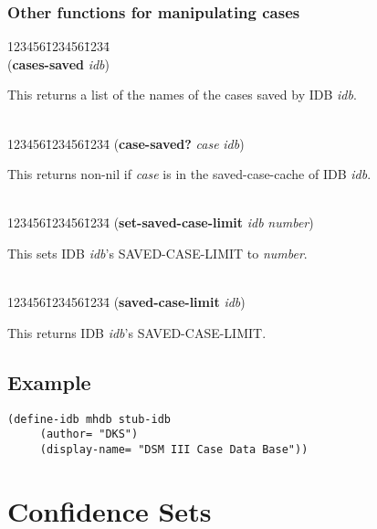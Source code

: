 \subsection{Other functions for manipulating cases}

\begin{tabbing}
123456\=123456\=1234\= \kill
\\
({\bf cases-saved} {\it idb}) \\
\end{tabbing}
This returns a list of the names of the cases saved by IDB {\it idb\/}.

\begin{tabbing}
\\
123456\=123456\=1234\= \kill
({\bf case-saved?} {\it case} {\it idb}) \\
\end{tabbing}
This returns non-nil if {\it case} is in the saved-case-cache of IDB
{\it idb\/}.


\begin{tabbing}
\\
123456\=123456\=1234\= \kill
({\bf set-saved-case-limit} {\it idb} {\it number}) \\
\end{tabbing}
This sets IDB {\it idb\/}'s SAVED-CASE-LIMIT to {\it number\/}.

\begin{tabbing}
\\
123456\=123456\=1234\= \kill
({\bf saved-case-limit} {\it idb}) \\
\end{tabbing}
This returns IDB {\it idb\/}'s SAVED-CASE-LIMIT.

\section{Example}

\begin{verbatim}
(define-idb mhdb stub-idb
     (author= "DKS")
     (display-name= "DSM III Case Data Base"))
\end{verbatim}



\chapter{Confidence Sets\label{confidence sets}}

